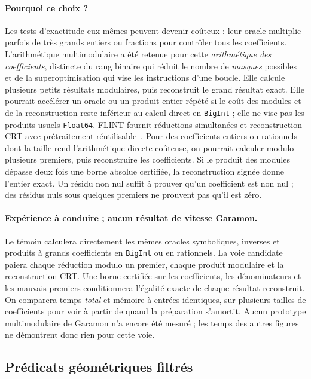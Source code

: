 \documentclass[11pt,a4paper]{article}
\newcommand{\code}[1]{\texttt{#1}}
\begin{document}
\paragraph{Pourquoi ce choix ?}
Les tests d'exactitude eux-mêmes peuvent devenir coûteux : leur oracle
multiplie parfois de très grands entiers ou fractions pour contrôler tous
les coefficients. L'arithmétique multimodulaire a été retenue pour cette
\emph{arithmétique des coefficients}, distincte du rang binaire qui réduit
le nombre de \emph{masques} possibles et de la superoptimisation qui vise
les instructions d'une boucle. Elle calcule plusieurs petits résultats
modulaires, puis reconstruit le grand résultat exact. Elle pourrait
accélérer un oracle ou un produit entier répété si le coût des modules et
de la reconstruction reste inférieur au calcul direct en \code{BigInt} ;
elle ne vise pas les produits usuels \code{Float64}.
FLINT fournit réductions simultanées et reconstruction CRT avec
prétraitement réutilisable~\cite{flintcrt}. Pour des coefficients entiers ou
rationnels dont la taille rend l'arithmétique directe coûteuse, on pourrait
calculer modulo plusieurs premiers, puis reconstruire les coefficients.
Si le produit des modules dépasse deux fois une borne absolue certifiée,
la reconstruction signée donne l'entier exact. Un résidu non nul suffit à
prouver qu'un coefficient est non nul ; des résidus nuls sous quelques
premiers ne prouvent pas qu'il est zéro.

\paragraph{Expérience à conduire ; aucun résultat de vitesse Garamon.}
Le témoin calculera directement les mêmes oracles symboliques, inverses
et produits à grands coefficients en \code{BigInt} ou en rationnels.
La voie candidate paiera chaque réduction modulo un premier, chaque
produit modulaire et la reconstruction CRT. Une borne certifiée sur les
coefficients, les dénominateurs et les mauvais premiers conditionnera
l'égalité exacte de chaque résultat reconstruit. On comparera temps
\emph{total} et mémoire à entrées identiques, sur plusieurs tailles de
coefficients pour voir à partir de quand la préparation s'amortit.
Aucun prototype multimodulaire de Garamon n'a encore été mesuré ; les
temps des autres figures ne démontrent donc rien pour cette voie.

\subsection{Prédicats géométriques filtrés}
\end{document}
